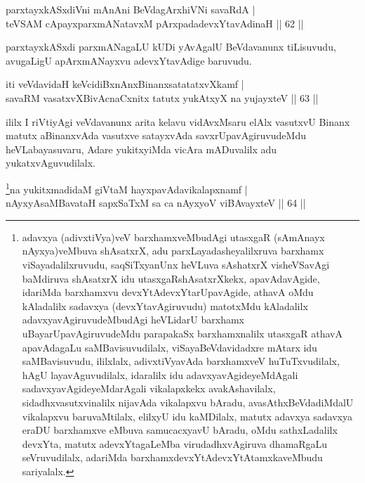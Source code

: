 \begin{shl}
parxtayxkASxdiVni mAnAni BeVdagArxhiVNi savaRdA  | \\
teVSAM cApayxparxmANatavxM pArxpadadevxYtavAdinaH \hfill||  62 ||  
\end{shl}

\begin{artha}
parxtayxkASxdi parxmANagaLU kUDi yAvAgalU BeVdavanunx tiLisuvudu, avugaLigU apArxmANayxvu adevxYtavAdige baruvudu.
\end{artha}


\begin{shl}
iti veVdavidaH keVcidiBxnAnxBinanxsatatatxvXkamf  | \\
savaRM vasatxvXBivAcnaCxnitx tatutx yukAtxyX na yujayxteV \hfill||  63 ||  
\end{shl}

\begin{artha}
ililx I riVtiyAgi veVdavanunx arita kelavu vidAvxMsaru elAlx vasutxvU Binanx matutx aBinanxvAda vasutxve satayxvAda savxrUpavAgiruvudeMdu heVLabayasuvaru, Adare yukitxyiMda vicAra mADuvalilx adu yukatxvAguvudilalx.
\end{artha}



\begin{shl}
\footnote{adavxya (adivxtiVya)veV barxhamxveMbudAgi utasxgaR (sAmAnayx nAyxya)veMbuva shAsatxrX, adu parxLayadasheyalilxruva barxhamx viSayadalilxruvudu, saqSiTxyanUnx heVLuva sAshatxrX visheVSavAgi baMdiruva shAsatxrX idu utasxgaRshAsatxrXkekx, apavAdavAgide, idariMda barxhamxvu devxYtAdevxYtarUpavAgide, athavA oMdu kAladalilx sadavxya (devxYtavAgiruvudu) matotxMdu kAladalilx adavxyavAgiruvudeMbudAgi heVLidarU barxhamx uBayarUpavAgiruvudeMdu parapakaSx barxhamxnalilx utasxgaR athavA apavAdagaLu saMBavisuvudilalx, viSayaBeVdavidadxre mAtarx idu saMBavisuvudu, ililxlalx, adivxtiVyavAda barxhamxveV huTuTxvudilalx, hAgU layavAguvudilalx, idaralilx idu adavxyavAgideyeMdAgali sadavxyavAgideyeMdarAgali vikalapxkekx avakAshavilalx, sidadhxvasutxvinalilx nijavAda vikalapxvu bAradu, avasAthxBeVdadiMdalU vikalapxvu baruvaMtilalx, elilxyU idu kaMDilalx, matutx adavxya sadavxya eraDU barxhamxve eMbuva samucacxyavU bAradu, oMdu sathxLadalilx devxYta, matutx adevxYtagaLeMba virudadhxvAgiruva dhamaRgaLu seVruvudilalx, adariMda barxhamxdevxYtAdevxYtAtamxkaveMbudu sariyalalx.}na yukitxmadidaM giVtaM hayxpavAdavikalapxnamf  | \\
nAyxyAsaMBavataH sapxSaTxM sa ca nAyxyoV viBAvayxteV \hfill||  64 ||  
\end{shl}

